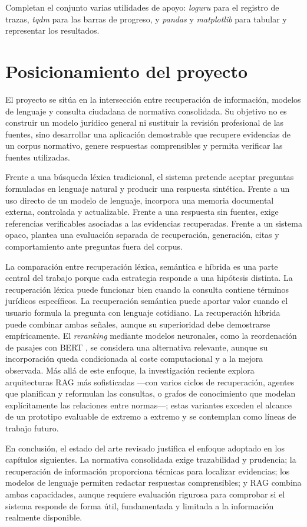Completan el conjunto varias utilidades de apoyo: \emph{loguru} para el registro de trazas, \emph{tqdm} para las barras de progreso, y \emph{pandas} y \emph{matplotlib} para tabular y representar los resultados.

\section{Posicionamiento del proyecto}
\label{sec:posicionamiento-proyecto}

El proyecto se sitúa en la intersección entre recuperación de información, modelos de lenguaje y consulta ciudadana de normativa consolidada. Su objetivo no es construir un modelo jurídico general ni sustituir la revisión profesional de las fuentes, sino desarrollar una aplicación demostrable que recupere evidencias de un corpus normativo, genere respuestas comprensibles y permita verificar las fuentes utilizadas.

Frente a una búsqueda léxica tradicional, el sistema pretende aceptar preguntas formuladas en lenguaje natural y producir una respuesta sintética. Frente a un uso directo de un modelo de lenguaje, incorpora una memoria documental externa, controlada y actualizable. Frente a una respuesta sin fuentes, exige referencias verificables asociadas a las evidencias recuperadas. Frente a un sistema opaco, plantea una evaluación separada de recuperación, generación, citas y comportamiento ante preguntas fuera del corpus.

La comparación entre recuperación léxica, semántica e híbrida es una parte central del trabajo porque cada estrategia responde a una hipótesis distinta. La recuperación léxica puede funcionar bien cuando la consulta contiene términos jurídicos específicos. La recuperación semántica puede aportar valor cuando el usuario formula la pregunta con lenguaje cotidiano. La recuperación híbrida puede combinar ambas señales, aunque su superioridad debe demostrarse empíricamente. El \emph{reranking} mediante modelos neuronales, como la reordenación de pasajes con BERT \cite{nogueira2019bert}, se considera una alternativa relevante, aunque su incorporación queda condicionada al coste computacional y a la mejora observada. Más allá de este enfoque, la investigación reciente explora arquitecturas RAG más sofisticadas —con varios ciclos de recuperación, agentes que planifican y reformulan las consultas, o grafos de conocimiento que modelan explícitamente las relaciones entre normas—; estas variantes exceden el alcance de un prototipo evaluable de extremo a extremo y se contemplan como líneas de trabajo futuro.

En conclusión, el estado del arte revisado justifica el enfoque adoptado en los capítulos siguientes. La normativa consolidada exige trazabilidad y prudencia; la recuperación de información proporciona técnicas para localizar evidencias; los modelos de lenguaje permiten redactar respuestas comprensibles; y RAG combina ambas capacidades, aunque requiere evaluación rigurosa para comprobar si el sistema responde de forma útil, fundamentada y limitada a la información realmente disponible.

